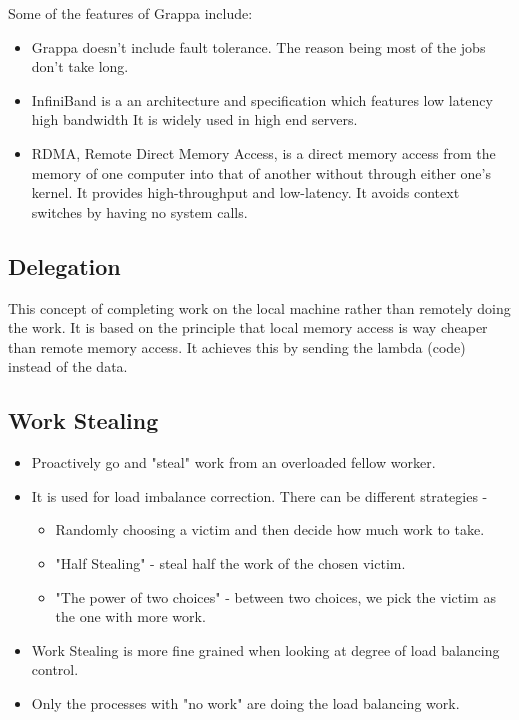 \documentclass[twoside]{article}
\begin{document}
Some of the features of Grappa include:
\begin{itemize}
    \item Grappa doesn't include fault tolerance. The reason being most of the jobs don't take long. 
    \item InfiniBand is a  an architecture and specification which features low latency
high bandwidth It is widely used in high end servers.
   \item RDMA, Remote Direct Memory Access, is a direct memory access from the memory of
one computer into that of another without through either one's kernel. It
provides high-throughput and low-latency. It avoids context switches by having no system calls.
\end{itemize}


\subsection{Delegation}
This concept of completing work on the local machine rather than remotely doing the work. It is based on the principle that local memory access is way cheaper than remote memory access. It achieves this by sending the lambda (code) instead of the data.

\subsection{Work Stealing}
\begin{itemize}
\item Proactively go and "steal" work from an overloaded fellow worker. 
\item It is used for load imbalance correction. There can be different strategies - 
\begin{itemize}
\item Randomly choosing a victim and then decide how much work to take. 
\item "Half Stealing" - steal half the work of the chosen victim.
\item "The power of two choices" - between two choices, we pick the victim as the one with more work.
\end{itemize}
\item Work Stealing is more fine grained when looking at degree of load balancing control.
\item Only the processes with "no work" are doing the load balancing work. 
\end{itemize}
\end{document}
